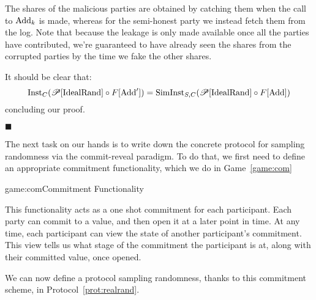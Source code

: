 \begin{claim}
    The shares of the malicious parties are obtained by catching them
    when the call to $\text{Add}_k$ is made, whereas for the semi-honest party
    we instead fetch them from the log.
    Note that because the leakage is only made available once all the parties
    have contributed, we're guaranteed to have already seen the shares
    from the corrupted parties by the time we fake the other shares.

    It should be clear that:
    $$
    \text{Inst}_C(\mathscr{P}[\text{IdealRand}] \circ F[\text{Add}']) = 
    \text{SimInst}_{S, C}(\mathscr{P}[\text{IdealRand}] \circ F[\text{Add}])
    $$
    concluding our proof.

    $\blacksquare$
\end{claim}

The next task on our hands is to write down the concrete protocol
for sampling randomness via the commit-reveal paradigm.
To do that, we first need to define an appropriate commitment functionality,
which we do in Game~\ref{game:com}

\begin{game}{game:com}{Commitment Functionality}
\end{game}

This functionality acts as a one shot commitment for each participant.
Each party can commit to a value, and then open it at a later point in time.
At any time, each participant can view the state of another participant's
commitment.
This view tells us what stage of the commitment the participant is at,
along with their committed value, once opened.

We can now define a protocol sampling randomness, thanks to this commitment
scheme, in Protocol~\ref{prot:realrand}.

